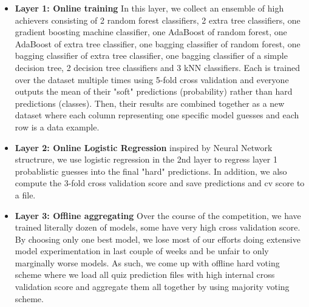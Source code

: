 \documentclass[conference]{IEEEtran}
\begin{document}
\begin{itemize}
\item \textbf{Layer 1: Online training} In this layer, we collect an ensemble of high achievers consisting of 2 random forest classifiers, 2 extra tree classifiers, one gradient boosting machine classifier, one AdaBoost of random forest, one AdaBoost of extra tree classifier, one bagging classifier of random forest, one bagging classifier of extra tree classifier, one bagging classifier of a simple decision tree, 2 decision tree classifiers and 3 kNN classifiers. Each is trained over the dataset multiple times using 5-fold cross validation and everyone outputs the mean of their "soft" predictions (probability) rather than hard predictions (classes). Then, their results are combined together as a new dataset where each column representing one specific model guesses and each row is a data example.
\item \textbf{Layer 2: Online Logistic Regression} inspired by Neural Network structrure, we use logistic regression in the 2nd layer to regress layer 1 probablistic guesses into the final "hard" predictions. In addition, we also compute the 3-fold cross validation score and save predictions and cv score to a file.
\item \textbf{Layer 3: Offline aggregating} Over the course of the competition, we have trained literally dozen of models, some have very high cross validation score. By choosing only one best model, we lose most of our efforts doing extensive model experimentation in last couple of weeks and be unfair to only marginally worse models. As such, we come up with offline hard voting scheme where we load all quiz prediction files with high internal cross validation score and aggregate them all together by using majority voting scheme.
\end{itemize}
\end{document}
